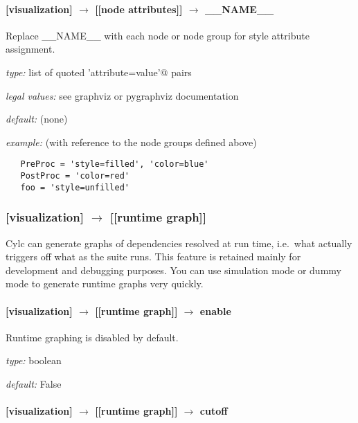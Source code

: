 \paragraph[\_\_NAME\_\_]{[visualization] $\rightarrow$ [[node attributes]] $\rightarrow$ \_\_NAME\_\_}

Replace \_\_NAME\_\_ with each node or node group for style attribute
assignment.

\begin{myitemize}
    \item {\em type:} list of quoted \lstinline@'attribute=value'@ pairs
    \item {\em legal values:} see graphviz or pygraphviz documentation
    \item {\em default:} (none)
    \item {\em example:} (with reference to the node groups defined above)
\begin{lstlisting}
   PreProc = 'style=filled', 'color=blue'
   PostProc = 'color=red'
   foo = 'style=unfilled'
\end{lstlisting}
\end{myitemize}

\subsubsection[{[[}runtime graph{]]}]{[visualization] $\rightarrow$ [[runtime graph]]}

Cylc can generate graphs of dependencies resolved at run time, i.e.\ what 
actually triggers off what as the suite runs. This feature is retained
mainly for development and debugging purposes. You can use simulation
mode or dummy mode to generate runtime graphs very quickly.

\paragraph[enable]{[visualization] $\rightarrow$ [[runtime graph]] $\rightarrow$ enable}

Runtime graphing is disabled by default.
\begin{myitemize}
    \item {\em type:} boolean
    \item {\em default:} False
\end{myitemize}

\paragraph[cutoff]{[visualization] $\rightarrow$ [[runtime graph]] $\rightarrow$ cutoff}

